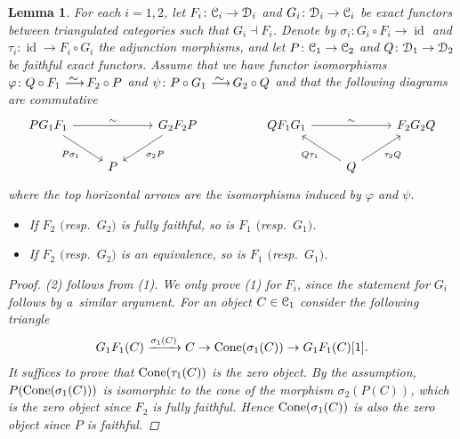 \documentclass[pdftex]{sigma}%
\newtheorem{lem}[dfn]{Lemma}
\numberwithin{equation}{section}
\newcommand{\id}{\operatorname{id}}
\newcommand{\scrC}{\EuScript{C}}
\newcommand{\scrD}{\EuScript{D}}
\newcommand{\simto}{\,\,\,\,\raisebox{4pt}{$\sim$}{\kern -1.1em \longrightarrow}\,}
\begin{document}
\begin{lem}\label{reduction lemma}
For each $i=1,2$, let $F_i\colon \scrC_i\to \scrD_i$ and $G_i\colon \scrD_i\to \scrC_i$ be exact functors between triangulated categories such that $G_i\dashv F_i$. Denote by $\sigma_i\colon G_i\circ F_i\to \id$ and $\tau_i\colon \id\to F_i\circ G_i$ the adjunction morphisms, and let $P\colon \scrC_1\to \scrC_2$ and $Q\colon \scrD_1\to\scrD_2$ be faithful exact functors. Assume that we have functor isomorphisms $\varphi\colon Q\circ F_1\simto F_2\circ P$ and $\psi\colon P\circ G_1\simto G_2\circ Q$ and that the following diagrams are commutative
\[
\begin{tikzcd}
PG_1F_1\arrow[rr, "\sim"]\arrow[rd, "P\sigma_1"']&&G_2F_2P\arrow[ld, "\sigma_2P"]&&
QF_1G_1\arrow[rr, "\sim"]&&F_2G_2Q\\
&P&&&&Q\arrow[lu, "Q\tau_1"]\arrow[ru, "\tau_2Q"']&
\end{tikzcd}
\]
where the top horizontal arrows are the isomorphisms induced by $\varphi$ and $\psi$.
\begin{itemize}\itemsep=0pt
\item[$1.$] If $F_2$ $($resp.\ $G_2)$ is fully faithful, so is $F_1$ $($resp.\ $G_1)$.
\item[$2.$] If $F_2$ $($resp.\ $G_2)$ is an equivalence, so is $F_1$ $($resp.\ $G_1)$.
\end{itemize}
\begin{proof}
(2) follows from (1). We only prove (1) for $F_i$, since the statement for $G_i$ follows by a~simi\-lar argument. For an object $C\in \scrC_1$ consider the following triangle
\begin{gather*}
 G_1F_1(C)\xrightarrow{\sigma_1(C)} C\to{\rm Cone}(\sigma_1(C))\to G_1F_1(C)[1].
\end{gather*}
It suffices to prove that ${\rm Cone}(\tau_1(C))$ is the zero object. By the assumption, $P({\rm Cone}(\sigma_1(C)))$ is isomorphic to the cone of the morphism $\sigma_2(P(C))$, which is the zero object since $F_2$ is fully faithful. Hence ${\rm Cone}(\sigma_1(C))$ is also the zero object since $P$ is faithful.
\end{proof}
\end{lem}
\end{document}
